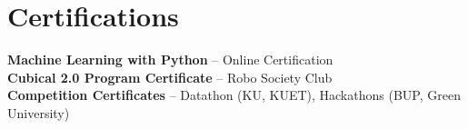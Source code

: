 \documentclass[letterpaper,11pt]{article}
\begin{document}
\section{Certifications}
    \begin{itemize}[leftmargin=0.15in, label={}]
        \small{\item{
         \textbf{Machine Learning with Python} -- Online Certification \\
         \textbf{Cubical 2.0 Program Certificate} -- Robo Society Club \\
         \textbf{Competition Certificates} -- Datathon (KU, KUET), Hackathons (BUP, Green University)
        }}
    \end{itemize}
\vspace{-16pt}
\end{document}
